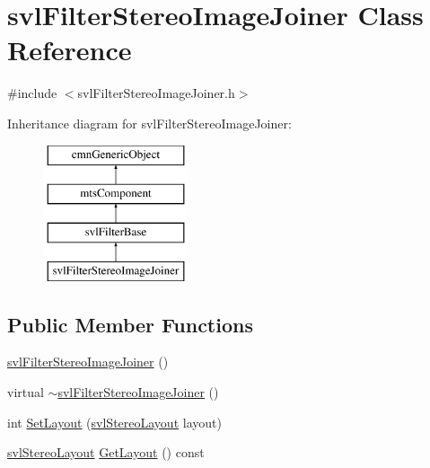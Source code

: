 \hypertarget{classsvl_filter_stereo_image_joiner}{\section{svl\-Filter\-Stereo\-Image\-Joiner Class Reference}
\label{classsvl_filter_stereo_image_joiner}
}


{\ttfamily \#include $<$svl\-Filter\-Stereo\-Image\-Joiner.\-h$>$}

Inheritance diagram for svl\-Filter\-Stereo\-Image\-Joiner\-:\begin{figure}[H]
\begin{center}
\leavevmode
\includegraphics[height=4.000000cm]{d0/d20/classsvl_filter_stereo_image_joiner}
\end{center}
\end{figure}
\subsection*{Public Member Functions}
\begin{DoxyCompactItemize}
\item 
\hyperlink{classsvl_filter_stereo_image_joiner_adfbcbdb5c5e39970f8782a53ed344925}{svl\-Filter\-Stereo\-Image\-Joiner} ()
\item 
virtual \hyperlink{classsvl_filter_stereo_image_joiner_aba3e2b20a2da5d7dfd68bea5e3c3ebe8}{$\sim$svl\-Filter\-Stereo\-Image\-Joiner} ()
\item 
int \hyperlink{classsvl_filter_stereo_image_joiner_a827f760bd99de6c243a61aa198ce63d7}{Set\-Layout} (\hyperlink{svl_definitions_8h_aa90f34342a069f42a847f43f2abb812f}{svl\-Stereo\-Layout} layout)
\item 
\hyperlink{svl_definitions_8h_aa90f34342a069f42a847f43f2abb812f}{svl\-Stereo\-Layout} \hyperlink{classsvl_filter_stereo_image_joiner_a80a8c30feab0beef2ef47f86a8c9b50c}{Get\-Layout} () const 
\end{DoxyCompactItemize}
